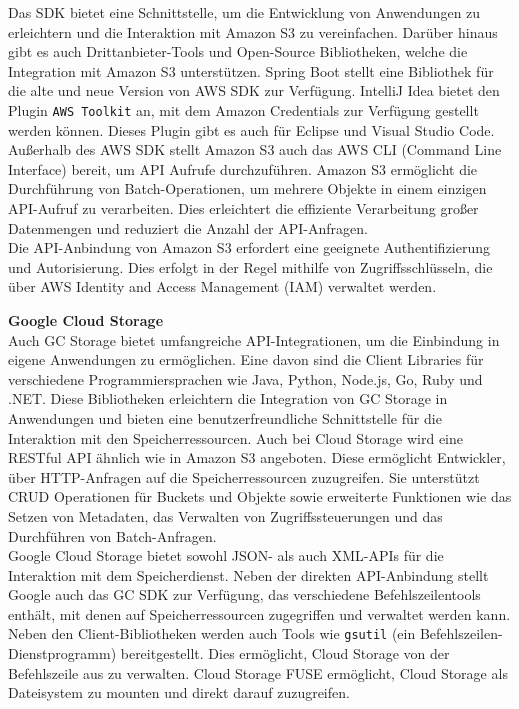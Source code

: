 Das SDK bietet eine Schnittstelle, um die Entwicklung von Anwendungen zu erleichtern und die Interaktion mit Amazon S3 zu vereinfachen. Darüber hinaus gibt es auch Drittanbieter-Tools und Open-Source Bibliotheken, welche die Integration mit Amazon S3 unterstützen. Spring Boot stellt eine Bibliothek für die alte und neue Version von AWS SDK zur Verfügung. IntelliJ Idea bietet den Plugin \verb|AWS Toolkit| an, mit dem Amazon Credentials zur Verfügung gestellt werden können. Dieses Plugin gibt es auch für Eclipse und Visual Studio Code.\\

Außerhalb des AWS SDK stellt Amazon S3 auch das AWS CLI (Command Line Interface) bereit, um API Aufrufe durchzuführen. Amazon S3 ermöglicht die Durchführung von Batch-Operationen, um mehrere Objekte in einem einzigen API-Aufruf zu verarbeiten. Dies erleichtert die effiziente Verarbeitung großer Datenmengen und reduziert die Anzahl der API-Anfragen.\\

Die API-Anbindung von Amazon S3 erfordert eine geeignete Authentifizierung und Autorisierung. Dies erfolgt in der Regel mithilfe von Zugriffsschlüsseln, die über AWS Identity and Access Management (IAM) verwaltet werden.

\newpage

\textbf{Google Cloud Storage}\\

Auch GC Storage bietet umfangreiche API-Integrationen, um die Einbindung in eigene Anwendungen zu ermöglichen. Eine davon sind die Client Libraries für verschiedene Programmiersprachen wie Java, Python, Node.js, Go, Ruby und .NET. Diese Bibliotheken erleichtern die Integration von GC Storage in Anwendungen und bieten eine benutzerfreundliche Schnittstelle für die Interaktion mit den Speicherressourcen. Auch bei Cloud Storage wird eine RESTful API ähnlich wie in Amazon S3 angeboten. Diese ermöglicht Entwickler, über HTTP-Anfragen auf die Speicherressourcen zuzugreifen. Sie unterstützt CRUD Operationen für Buckets und Objekte sowie erweiterte Funktionen wie das Setzen von Metadaten, das Verwalten von Zugriffssteuerungen und das Durchführen von Batch-Anfragen.\\

Google Cloud Storage bietet sowohl JSON- als auch XML-APIs für die Interaktion mit dem Speicherdienst. Neben der direkten API-Anbindung stellt Google auch das GC SDK zur Verfügung, das verschiedene Befehlszeilentools enthält, mit denen auf Speicherressourcen zugegriffen und verwaltet werden kann. Neben den Client-Bibliotheken werden auch Tools wie \verb|gsutil| (ein Befehlszeilen-Dienstprogramm) bereitgestellt. Dies ermöglicht, Cloud Storage von der Befehlszeile aus zu verwalten. Cloud Storage FUSE ermöglicht, Cloud Storage als Dateisystem zu mounten und direkt darauf zuzugreifen.\\

